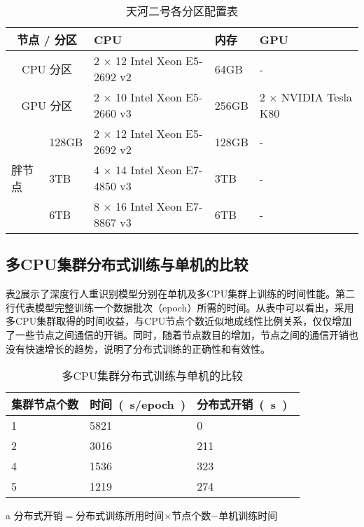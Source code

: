 \begin{table}[!ht]
\centering
\caption{天河二号各分区配置表}
\label{tab:tianheconfig}
\begin{tabularx}{\textwidth}{p{}<{\centering}p{}<{\centering}p{}<{\centering}p{}<{\centering}p{}<{\centering}}
\toprule
\multicolumn{2}{c}{节点 / 分区}  & CPU                          & 内存    & GPU                  \\ \midrule
\multicolumn{2}{c}{CPU 分区}  & 2 $\times$ 12 Intel Xeon E5-2692 v2 & 64GB  & -                    \\
\multicolumn{2}{c}{GPU 分区}  & 2 $\times$ 10 Intel Xeon E5-2660 v3 & 256GB & 2 $\times$ NVIDIA Tesla K80 \\
\multirow{3}{*}{胖节点} & 128GB & 2 $\times$ 12 Intel Xeon E5-2692 v2 & 128GB & -                    \\
                        & 3TB   & 4 $\times$ 14 Intel Xeon E7-4850 v3 & 3TB   & -                    \\
                        & 6TB   & 8 $\times$ 16 Intel Xeon E7-8867 v3 & 6TB   & -                    \\ \bottomrule
\end{tabularx}
\end{table}

\subsection{多CPU集群分布式训练与单机的比较}

表\ref{tab:comp1}展示了深度行人重识别模型分别在单机及多CPU集群上训练的时间性能。第二行代表模型完整训练一个数据批次（epoch）所需的时间。从表中可以看出，采用多CPU集群取得的时间收益，与CPU节点个数近似地成线性比例关系，仅仅增加了一些节点之间通信的开销。同时，随着节点数目的增加，节点之间的通信开销也没有快速增长的趋势，说明了分布式训练的正确性和有效性。

\begin{table}[!ht]
    \centering
    \caption{多CPU集群分布式训练与单机的比较}
    \label{tab:comp1}
    \begin{threeparttable}
    \begin{tabularx}{\textwidth}{X<{\centering}X<{\centering}X<{\centering}}
    \toprule
    集群节点个数 & 时间~(~s/epoch~) & 分布式开销~(~s~)~\tnote{a} \\ \midrule
    1 & 5821 & 0   \\
    2 & 3016 & 211 \\
    4 & 1536 & 323 \\
    5 & 1219 & 274 \\ \bottomrule
    \end{tabularx}
    \begin{tablenotes}
        \footnotesize
        \item[a] 分布式开销$=$分布式训练所用时间$\times$节点个数$-$单机训练时间
    \end{tablenotes}
    \end{threeparttable}
\end{table}

